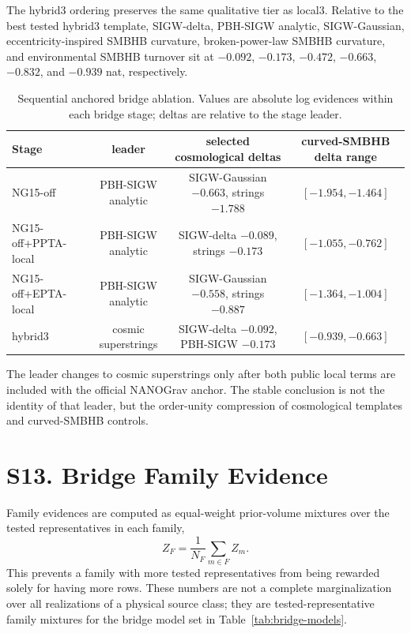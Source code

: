 \documentclass[aps,prl,superscriptaddress,nofootinbib]{revtex4-2}
\begin{document}
The hybrid3 ordering preserves the same qualitative tier as local3.  Relative
to the best tested hybrid3 template, SIGW-delta, PBH-SIGW analytic,
SIGW-Gaussian, eccentricity-inspired SMBHB curvature, broken-power-law SMBHB
curvature, and environmental SMBHB turnover sit at $-0.092$, $-0.173$,
$-0.472$, $-0.663$, $-0.832$, and $-0.939$ nat, respectively.

\begin{table}[H]
\caption{\label{tab:bridge-sequence}Sequential anchored bridge ablation.
Values are absolute log evidences within each bridge stage; deltas are relative
to the stage leader.}
\begin{ruledtabular}
\begin{tabular}{lccc}
Stage & leader & selected cosmological deltas & curved-SMBHB delta range \\
\hline
NG15-off & PBH-SIGW analytic & SIGW-Gaussian $-0.663$, strings $-1.788$ &
$[-1.954,-1.464]$ \\
NG15-off+PPTA-local & PBH-SIGW analytic & SIGW-delta $-0.089$, strings $-0.173$ &
$[-1.055,-0.762]$ \\
NG15-off+EPTA-local & PBH-SIGW analytic & SIGW-Gaussian $-0.558$, strings $-0.887$ &
$[-1.364,-1.004]$ \\
hybrid3 & cosmic superstrings & SIGW-delta $-0.092$, PBH-SIGW $-0.173$ &
$[-0.939,-0.663]$ \\
\end{tabular}
\end{ruledtabular}
\end{table}

The leader changes to cosmic superstrings only after both public local terms
are included with the official NANOGrav anchor.  The stable conclusion is not
the identity of that leader, but the order-unity compression of cosmological
templates and curved-SMBHB controls.

\section*{S13. Bridge Family Evidence}

Family evidences are computed as equal-weight prior-volume mixtures over the
tested representatives in each family,
\begin{equation}
Z_F=\frac{1}{N_F}\sum_{m\in F} Z_m .
\end{equation}
This prevents a family with more tested representatives from being rewarded
solely for having more rows.  These numbers are not a complete
marginalization over all realizations of a physical source class; they are
tested-representative family mixtures for the bridge model set in
Table~\ref{tab:bridge-models}.
\end{document}
